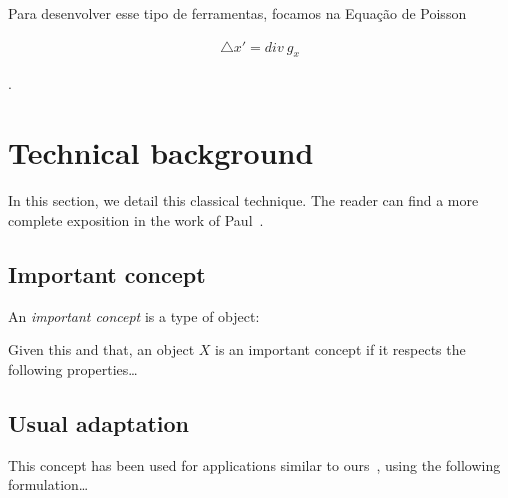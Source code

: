 




Para desenvolver esse tipo de ferramentas, focamos na Equação de Poisson

\begin{eqnarray}
\bigtriangleup x' = div\  \textbf{$g_x$}
\end{eqnarray}










%
.



\section{Technical background}
%
In this section, we detail this classical technique. The reader can find a more complete exposition in the work of Paul~\cite{Sibgrapi2014}.


\subsection{Important concept}
%
An \emph{important concept} is a type of object:
\begin{definition}
Given this and that, an object $X$ is an important concept if it respects the following properties\ldots{}
\end{definition}


\subsection{Usual adaptation}
%
This concept has been used for applications similar to ours~\cite{Sibgrapi2014}, using the following formulation\ldots{}